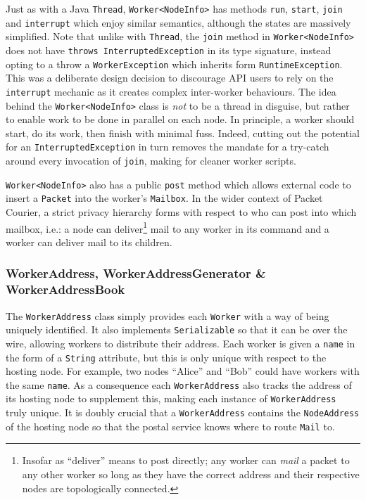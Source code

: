 Just as with a Java \texttt{Thread}\cite{java_Thread}, \texttt{Worker<NodeInfo>} has methods \texttt{run},
\texttt{start}, \texttt{join} and \texttt{interrupt} which enjoy similar semantics, although the states are massively
simplified. Note that unlike with \texttt{Thread}, the \texttt{join} method in \texttt{Worker<NodeInfo>} does not
have \texttt{throws InterruptedException} in its type signature, instead opting to a throw a \texttt{WorkerException}
which inherits form \texttt{RuntimeException}\cite{java_RuntimeException}. This was a deliberate design decision to
discourage API users to rely on the \texttt{interrupt} mechanic as it creates complex inter-worker behaviours. The
idea behind the \texttt{Worker<NodeInfo>} class is \emph{not} to be a thread in disguise, but rather to enable work
to be done in parallel on each node. In principle, a worker should start, do its work, then finish with minimal fuss.
Indeed, cutting out the potential for an \texttt{InterruptedException} in turn removes the mandate for a try-catch
around every invocation of \texttt{join}, making for cleaner worker scripts.

\texttt{Worker<NodeInfo>} also has a public \texttt{post} method which allows external code to insert a
\texttt{Packet} into the worker's \texttt{Mailbox}. In the wider context of Packet Courier, a strict privacy
hierarchy forms with respect to who can post into which mailbox, i.e.: a node can deliver\footnote{Insofar as
``deliver'' means to post directly; any worker can \emph{mail} a packet to any other worker so long as they have the
correct address and their respective nodes are topologically connected.} mail to any worker in its command and a
worker can deliver mail to its children.

\subsubsection{WorkerAddress, WorkerAddressGenerator \& WorkerAddressBook}

The \texttt{WorkerAddress} class simply provides each \texttt{Worker} with a way of being uniquely identified. It
also implements \texttt{Serializable}\cite{java_Serializable} so that it can be over the wire, allowing workers to
distribute their address. Each worker is given a \texttt{name} in the form of a \texttt{String}
attribute, but this is only unique with respect to the hosting node. For example, two nodes ``Alice'' and ``Bob''
could have workers with the same \texttt{name}. As a consequence each \texttt{WorkerAddress} also tracks the address
of its hosting node to supplement this, making each instance of \texttt{WorkerAddress} truly unique. It is doubly
crucial that a \texttt{WorkerAddress} contains the \texttt{NodeAddress} of the hosting node so that the postal
service knows where to route \texttt{Mail} to.

